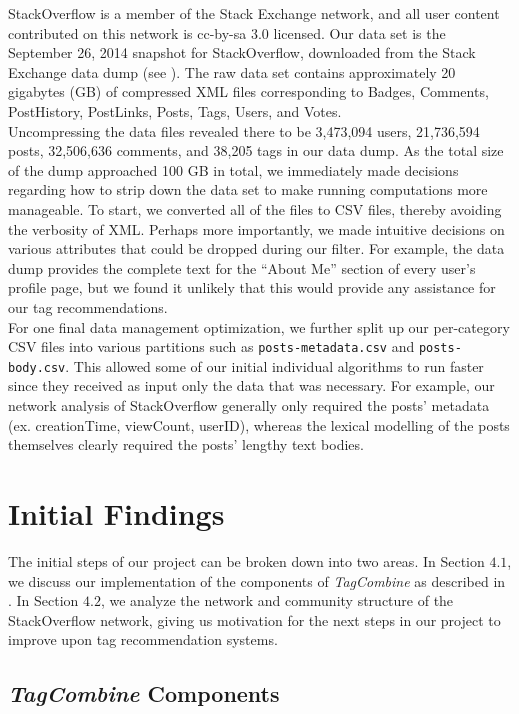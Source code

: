 \documentclass[10pt, final]{article}
\newcommand{\br}[1][.75]{\ \\[#1\baselineskip]}
\begin{document}
StackOverflow is a member of the Stack Exchange network, and all user content contributed on this network is cc-by-sa 3.0 licensed. Our data set is the September 26, 2014 snapshot for StackOverflow, downloaded from the Stack Exchange data dump (see \cite{6}). The raw data set contains approximately 20 gigabytes (GB) of compressed XML files corresponding to Badges, Comments, PostHistory, PostLinks, Posts, Tags, Users, and Votes.\br
Uncompressing the data files revealed there to be 3,473,094 users, 21,736,594 posts, 32,506,636 comments, and 38,205 tags in our data dump. As the total size of the dump approached 100 GB in total, we immediately made decisions regarding how to strip down the data set to make running computations more manageable. To start, we converted all of the files to CSV files, thereby avoiding the verbosity of XML. Perhaps more importantly, we made intuitive decisions on various attributes that could be dropped during our filter. For example, the data dump provides the complete text for the ``About Me'' section of every user's profile page, but we found it unlikely that this would provide any assistance for our tag recommendations.\br
For one final data management optimization, we further split up our per-category CSV files into various partitions such as \texttt{posts-metadata.csv} and \texttt{posts-body.csv}. This allowed some of our initial individual algorithms to run faster since they received as input only the data that was necessary. For example, our network analysis of StackOverflow generally only required the posts' metadata (ex. creationTime, viewCount, userID), whereas the lexical modelling of the posts themselves clearly required the posts' lengthy text bodies.

\section{Initial Findings}

The initial steps of our project can be broken down into two areas. In Section $4.1$, we discuss our implementation of the components of \textit{TagCombine} as described in \cite{1}. In Section $4.2$, we analyze the network and community structure of the StackOverflow network, giving us motivation for the next steps in our project to improve upon tag recommendation systems.

\subsection{\textit{TagCombine} Components}
\end{document}
